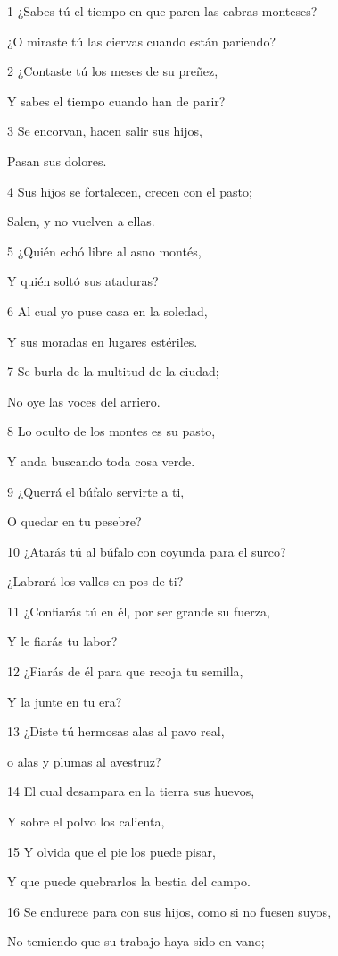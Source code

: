 \par 1 ¿Sabes tú el tiempo en que paren las cabras monteses?
\par ¿O miraste tú las ciervas cuando están pariendo? 
\par 2 ¿Contaste tú los meses de su preñez,
\par Y sabes el tiempo cuando han de parir?
\par 3 Se encorvan, hacen salir sus hijos,
\par Pasan sus dolores.
\par 4 Sus hijos se fortalecen, crecen con el pasto;
\par Salen, y no vuelven a ellas. 
\par 5 ¿Quién echó libre al asno montés,
\par Y quién soltó sus ataduras?
\par 6 Al cual yo puse casa en la soledad,
\par Y sus moradas en lugares estériles.
\par 7 Se burla de la multitud de la ciudad;
\par No oye las voces del arriero.
\par 8 Lo oculto de los montes es su pasto,
\par Y anda buscando toda cosa verde.
\par 9 ¿Querrá el búfalo servirte a ti,
\par O quedar en tu pesebre?
\par 10 ¿Atarás tú al búfalo con coyunda para el surco?
\par ¿Labrará los valles en pos de ti?
\par 11 ¿Confiarás tú en él, por ser grande su fuerza,
\par Y le fiarás tu labor? 
\par 12 ¿Fiarás de él para que recoja tu semilla,
\par Y la junte en tu era?
\par 13 ¿Diste tú hermosas alas al pavo real,
\par o alas y plumas al avestruz?
\par 14 El cual desampara en la tierra sus huevos,
\par Y sobre el polvo los calienta,
\par 15 Y olvida que el pie los puede pisar,
\par Y que puede quebrarlos la bestia del campo.
\par 16 Se endurece para con sus hijos, como si no fuesen suyos,
\par No temiendo que su trabajo haya sido en vano;
